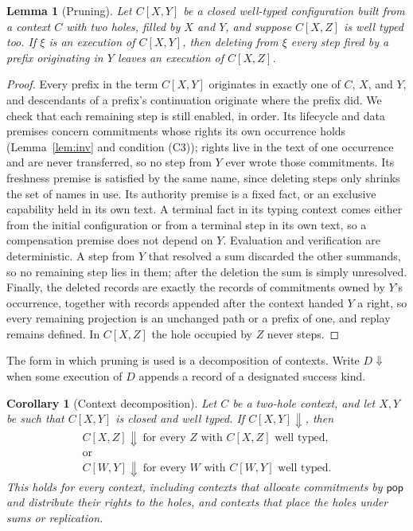 \documentclass[11pt,openany]{book}
\newtheorem{lemma}[theorem]{Lemma}
\newtheorem{corollary}[theorem]{Corollary}
\theoremstyle{remark}
\begin{document}
\begin{lemma}[Pruning]\label{lem:prune}
Let $C[X,Y]$ be a closed well-typed configuration built from a context $C$
with two holes, filled by $X$ and $Y$, and suppose $C[X,Z]$ is well typed
too. If $\xi$ is an execution of $C[X,Y]$, then deleting from $\xi$ every
step fired by a prefix originating in $Y$ leaves an execution of $C[X,Z]$.
\end{lemma}

\begin{proof}
Every prefix in the term $C[X,Y]$ originates in exactly one of $C$, $X$,
and $Y$, and descendants of a prefix's continuation originate where the
prefix did. We check that each remaining step is still enabled, in order.
Its lifecycle and data premises concern commitments whose rights its own
occurrence holds (Lemma~\ref{lem:inv} and condition (C3)); rights live in
the text of one occurrence and are never transferred, so no step from $Y$
ever wrote those commitments. Its freshness premise is satisfied by the
same name, since deleting steps only shrinks the set of names in use. Its
authority premise is a fixed fact, or an exclusive capability held in its
own text. A terminal fact in its typing context comes either from the
initial configuration or from a terminal step in its own text, so a
compensation premise does not depend on $Y$. Evaluation and verification
are deterministic. A step from $Y$ that resolved a sum discarded the other
summands, so no remaining step lies in them; after the deletion the sum is
simply unresolved. Finally, the deleted records are exactly the records
of commitments owned by $Y$'s occurrence, together with records appended
after the context handed $Y$ a right, so every remaining projection is an
unchanged path or a prefix of one, and replay remains defined. In
$C[X,Z]$ the hole occupied by $Z$ never steps.
\end{proof}

The form in which pruning is used is a decomposition of contexts.
Write $D\Downarrow$ when some execution of $D$ appends a record of a
designated success kind.

\begin{corollary}[Context decomposition]\label{cor:decomp}
Let $C$ be a two-hole context, and let $X,Y$ be such that $C[X,Y]$ is
closed and well typed. If $C[X,Y]\Downarrow$, then
\[
\begin{gathered}
C[X,Z]\Downarrow\ \text{for every $Z$ with $C[X,Z]$ well typed,}\\
\text{or}\\
C[W,Y]\Downarrow\ \text{for every $W$ with $C[W,Y]$ well typed.}
\end{gathered}
\]
This holds for every context, including contexts that allocate
commitments by $\mathsf{pop}$ and distribute their rights to the holes,
and contexts that place the holes under sums or replication.
\end{corollary}
\end{document}
